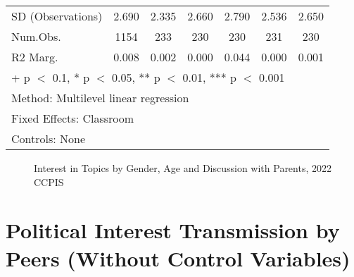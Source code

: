 \documentclass[
  letterpaper,
  DIV=11,
  numbers=noendperiod]{scrreprt}
\begin{document}
\begin{table}
\begin{tabular}[t]{lcccccc}
\hspace{1em}SD (Observations) & 2.690 & 2.335 & 2.660 & 2.790 & 2.536 & 2.650\\
\hspace{1em}Num.Obs. & 1154 & 233 & 230 & 230 & 231 & 230\\
\hspace{1em}R2 Marg. & 0.008 & 0.002 & 0.000 & 0.044 & 0.000 & 0.001\\
\bottomrule
\multicolumn{7}{l}{\rule{0pt}{1em}+ p $<$ 0.1, * p $<$ 0.05, ** p $<$ 0.01, *** p $<$ 0.001}\\
\multicolumn{7}{l}{\rule{0pt}{1em}Method: Multilevel linear regression}\\
\multicolumn{7}{l}{\rule{0pt}{1em}Fixed Effects: Classroom}\\
\multicolumn{7}{l}{\rule{0pt}{1em}Controls: None}\\
\end{tabular}
\end{table}

\begin{figure}


\caption{\label{fig-discussparentyo}Interest in Topics by Gender, Age
and Discussion with Parents, 2022 CCPIS}

\end{figure}%

\chapter{Political Interest Transmission by Peers (Without Control
Variables)}\label{sec-appendix7}
\end{document}
